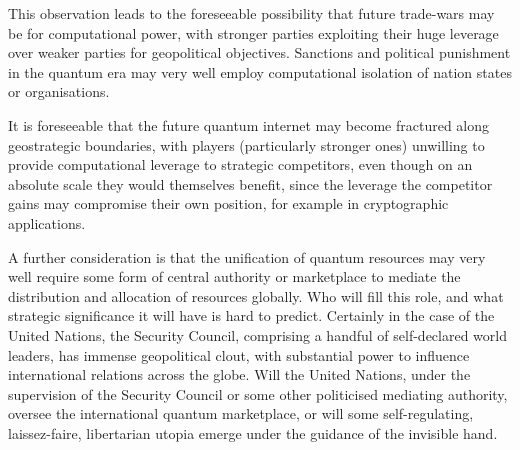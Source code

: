 This observation leads to the foreseeable possibility that future trade-wars may be for computational power, with stronger parties exploiting their huge leverage over weaker parties for geopolitical objectives. Sanctions and political punishment in the quantum era may very well employ computational isolation of nation states or organisations.

It is foreseeable that the future quantum internet may become fractured along geostrategic boundaries, with players (particularly stronger ones) unwilling to provide computational leverage to strategic competitors, even though on an absolute scale they would themselves benefit, since the leverage the competitor gains may compromise their own position, for example in cryptographic applications.

A further consideration is that the unification of quantum resources may very well require some form of central authority or marketplace to mediate the distribution and allocation of resources globally. Who will fill this role, and what strategic significance it will have is hard to predict. Certainly in the case of the United Nations, the Security Council, comprising a handful of self-declared world leaders, has immense geopolitical clout, with substantial power to influence international relations across the globe. Will the United Nations, under the supervision of the Security Council or some other politicised mediating authority, oversee the international quantum marketplace, or will some self-regulating, laissez-faire, libertarian utopia emerge under the guidance of the invisible hand. 